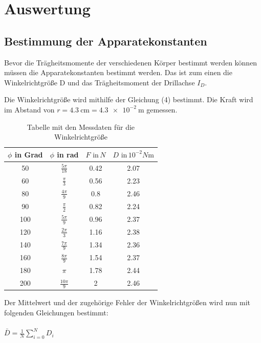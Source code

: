 \section{Auswertung}
\subsection{Bestimmung der Apparatekonstanten}

Bevor die Trägheitsmomente der verschiedenen Körper bestimmt werden können müssen die
Apparatekonstanten bestimmt werden. Das ist zum einen die Winkelrichtgröße D und
das Trägheitsmoment der Drillachse $I_D$.

Die Winkelrichtgröße wird mithilfe der Gleichung (4) bestimmt. Die Kraft wird im Abstand
von $r = \SI{4.3}{\centi\meter} = \SI{4.3e-2}{\meter}$ gemessen.


\begin{table}[H]
  \centering
  \caption{Tabelle mit den Messdaten für die Winkelrichtgröße}
  \begin{tabular}{c c c c}
    \toprule
    $\phi$ in Grad & $\phi$ in rad & $F \, \, \text{in} \, N$ &
    $D \, \, \text{in} \, 10^{-2} N \si{\meter}$ \\
    \midrule
    50 &  $\frac{5\pi}{18}$ & 0.42 & 2.07 \\
    60 &  $\frac{\pi}{3}$ & 0.56 & 2.23 \\
    80 &  $\frac{4\pi}{9}$ & 0.8 & 2.46 \\
    90 &  $\frac{\pi}{2} $ & 0.82 & 2.24 \\
    100 & $\frac{5\pi}{9}$ & 0.96 & 2.37 \\
    120 & $\frac{2\pi}{3}$ & 1.16 & 2.38 \\
    140 & $\frac{7\pi}{9}$ & 1.34 & 2.36 \\
    160 & $\frac{8\pi}{9}$ & 1.54 & 2.37 \\
    180 & $\pi           $ & 1.78 & 2.44 \\
    200 & $\frac{10\pi}{9}$ &   2 & 2.46 \\
    \bottomrule
  \end{tabular}
\end{table}

Der Mittelwert und der zugehörige Fehler der Winkelrichtgrößen wird nun mit
folgenden Gleichungen bestimmt:\\\\


$\bar{D} = \frac{1}{N} \sum_{i=0}^{N} D_i$\\\\

